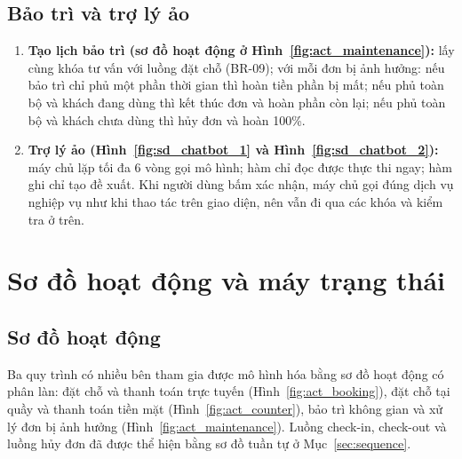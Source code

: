 \subsection{Bảo trì và trợ lý ảo}
\begin{enumerate}
    \item \textbf{Tạo lịch bảo trì (sơ đồ hoạt động ở Hình~\ref{fig:act_maintenance}):} lấy cùng khóa tư vấn với luồng đặt chỗ (BR-09); với mỗi đơn bị ảnh hưởng: nếu bảo trì chỉ phủ một phần thời gian thì hoàn tiền phần bị mất; nếu phủ toàn bộ và khách đang dùng thì kết thúc đơn và hoàn phần còn lại; nếu phủ toàn bộ và khách chưa dùng thì hủy đơn và hoàn 100\%.
    \item \textbf{Trợ lý ảo (Hình~\ref{fig:sd_chatbot_1} và Hình~\ref{fig:sd_chatbot_2}):} máy chủ lặp tối đa 6 vòng gọi mô hình; hàm chỉ đọc được thực thi ngay; hàm ghi chỉ tạo đề xuất. Khi người dùng bấm xác nhận, máy chủ gọi đúng dịch vụ nghiệp vụ như khi thao tác trên giao diện, nên vẫn đi qua các khóa và kiểm tra ở trên.
\end{enumerate}


\section{Sơ đồ hoạt động và máy trạng thái}
\label{sec:activity_state}

\subsection{Sơ đồ hoạt động}
Ba quy trình có nhiều bên tham gia được mô hình hóa bằng sơ đồ hoạt động có phân làn: đặt chỗ và thanh toán trực tuyến (Hình~\ref{fig:act_booking}), đặt chỗ tại quầy và thanh toán tiền mặt (Hình~\ref{fig:act_counter}), bảo trì không gian và xử lý đơn bị ảnh hưởng (Hình~\ref{fig:act_maintenance}). Luồng check-in, check-out và luồng hủy đơn đã được thể hiện bằng sơ đồ tuần tự ở Mục~\ref{sec:sequence}.


